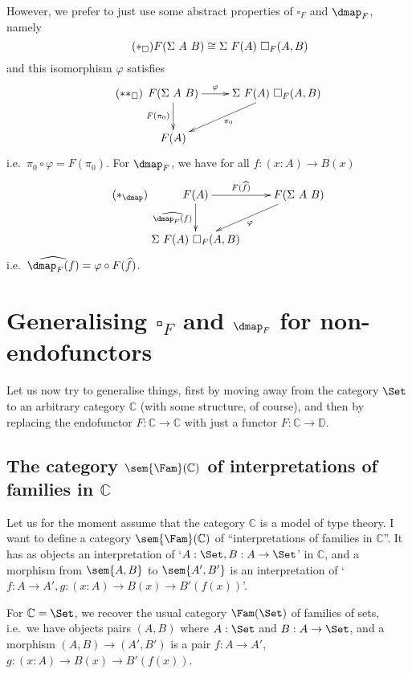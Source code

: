 \documentclass{article}
\begin{document}
However, we prefer to just use some abstract properties of $\square_F$
and $\dmap_F$, namely
\begin{equation}
  \label{eq:square}
  \tag{$\ast_{\square}$}
F (\Sigma\ A\ B) \cong \Sigma\ F(A)\ \square_F(A, B)
\end{equation}
and this isomorphism $\varphi$ satisfies
\begin{equation}
  \label{eq:square2}
  \tag{$\ast\ast_{\square}$}
\xymatrix
{
F(\Sigma\ A\ B) \ar^-{\varphi}[r] \ar_{F(\pi_0)}[d] & \Sigma\ F(A)\ \square_F(A, B) \ar^{\pi_0}[dl] \\
F(A)  & 
}
\end{equation}
i.e.\ $\pi_0 \circ \varphi = F(\pi_0)$. For $\dmap_F$, we have for all
$f : (x : A) \to B(x)$
\begin{equation}
  \label{eq:dmap}
  \tag{$\ast_{\dmap}$}
\xymatrix{
F(A) \ar^-{F(\widehat{f})}[r] \ar_{\widehat{\dmap_F(f)}}[d]& F(\Sigma\ A\ B) \ar^{\varphi}[dl] \\
\Sigma\ F(A)\ \square_F(A, B) & 
}
\end{equation}
i.e.\ $\widehat{\dmap_F(f)} = \varphi \circ F(\widehat{f})$.

\section{Generalising $\square_F$ and $\dmap_F$ for non-endofunctors}

Let us now try to generalise things, first by moving away from the
category $\Set$ to an arbitrary category $\mathbb{C}$ (with some
structure, of course), and then by replacing the endofunctor $F :
\mathbb{C} \to \mathbb{C}$ with just a functor $F : \mathbb{C} \to
\mathbb{D}$.

\subsection{The category $\sem{\Fam}(\mathbb{C})$ of interpretations
  of families in $\mathbb{C}$}

Let us for the moment assume that the category $\mathbb{C}$ is a model
of type theory. I want to define a category $\sem{\Fam}(\mathbb{C})$
of ``interpretations of families in $\mathbb{C}$''. It has as objects
an interpretation of `$A : \Set, B : A \to \Set$' in $\mathbb{C}$, and
a morphism from $\sem{A, B}$ to $\sem{A', B'}$ is an interpretation of
`$f : A \to A', g : (x : A) \to B(x) \to B'(f(x))$'.

\begin{example}[$\mathbb{C} = \Set$]
  For $\mathbb{C} = \Set$, we recover the usual category $\Fam(\Set)$
  of families of sets, i.e.\ we have objects pairs $(A, B)$ where $A :
  \Set$ and $B : A \to \Set$, and a morphism $(A, B) \to (A', B')$ is
  a pair $f : A \to A'$, $g : (x : A) \to B(x) \to B'(f(x))$.
\end{example}
\end{document}
